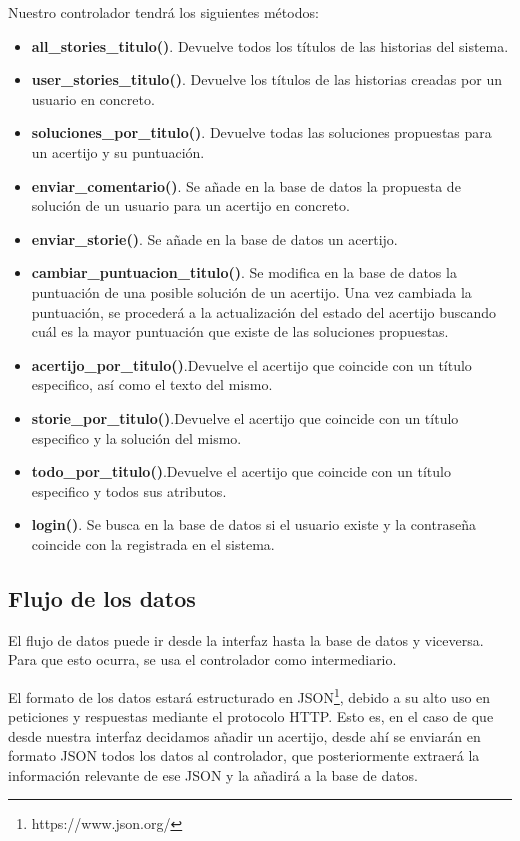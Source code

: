 Nuestro controlador tendrá los siguientes métodos:

\begin{itemize}
    \item \textbf{all\_stories\_titulo()}. Devuelve todos los títulos de las historias del sistema.
    \item \textbf{user\_stories\_titulo()}. Devuelve los títulos de las historias creadas por un usuario en concreto.
    \item \textbf{soluciones\_por\_titulo()}. Devuelve todas las soluciones propuestas para un acertijo y su puntuación.
    \item \textbf{enviar\_comentario()}. Se añade en la base de datos la propuesta de solución de un usuario para un acertijo en concreto.
    \item \textbf{enviar\_storie()}. Se añade en la base de datos un acertijo.
    \item \textbf{cambiar\_puntuacion\_titulo()}. Se modifica en la base de datos la puntuación de una posible solución de un acertijo. Una vez cambiada la puntuación, se procederá a la actualización del estado del acertijo buscando cuál es la mayor puntuación que existe de las soluciones propuestas.
    \item \textbf{acertijo\_por\_titulo()}.Devuelve el acertijo que coincide con un título especifico, así como el texto del mismo.
    \item \textbf{storie\_por\_titulo()}.Devuelve el acertijo que coincide con un título especifico y  la solución del mismo.
    \item \textbf{todo\_por\_titulo()}.Devuelve el acertijo que coincide con un título especifico y todos sus atributos.
    \item \textbf{login()}. Se busca en la base de datos si el usuario existe y la contraseña coincide con la registrada en el sistema.
\end{itemize}

\subsection{Flujo de los datos}

El flujo de datos puede ir desde la interfaz hasta la base de datos y viceversa. Para que esto ocurra, se usa el controlador como intermediario. 

El formato de los datos estará estructurado en JSON\footnote{https://www.json.org/}, debido a su alto uso en peticiones y respuestas mediante el protocolo HTTP.  Esto es, en el caso de que desde nuestra interfaz decidamos añadir un acertijo, desde ahí se enviarán en formato JSON todos los datos al controlador, que posteriormente extraerá la información relevante de ese JSON y la añadirá a la base de datos.

